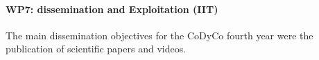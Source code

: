 \paragraph{WP7: dissemination and Exploitation (IIT)}

The main dissemination objectives for the CoDyCo fourth year were the publication of scientific papers and videos. 